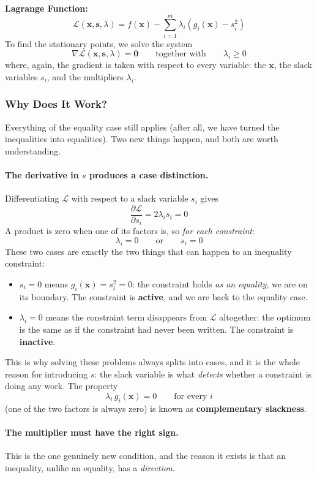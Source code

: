 \documentclass[]{article}
\begin{document}
	\textbf{Lagrange Function:}
	$$
	\mathcal{L}(\mathbf{x}, \mathbf{s}, \lambda)
	= f(\mathbf{x}) - \sum_{i=1}^m \lambda_i \left( g_i(\mathbf{x}) - s_i^2 \right)
	$$
	To find the stationary points, we solve the system
	$$
	\nabla \mathcal{L}(\mathbf{x}, \mathbf{s}, \lambda) = \mathbf{0}
	\qquad \text{together with} \qquad
	\lambda_i \geq 0
	$$
	where, again, the gradient is taken with respect to every variable: the $\mathbf{x}$, the slack variables $s_i$, and the multipliers $\lambda_i$.

	\subsubsection{Why Does It Work?}

	Everything of the equality case still applies (after all, we have turned the inequalities into equalities).
	Two new things happen, and both are worth understanding.

	\paragraph{The derivative in $s$ produces a case distinction.}
	Differentiating $\mathcal{L}$ with respect to a slack variable $s_i$ gives
	$$
	\frac{\partial \mathcal{L}}{\partial s_i} = 2 \lambda_i s_i = 0
	$$
	A product is zero when one of its factors is, so \textit{for each constraint}:
	$$
	\lambda_i = 0
	\qquad \text{or} \qquad
	s_i = 0
	$$
	These two cases are exactly the two things that can happen to an inequality constraint:
	\begin{itemize}
		\item $s_i = 0$ means $g_i(\mathbf{x}) = s_i^2 = 0$: the constraint holds \textit{as an equality}, we are on its boundary.
		The constraint is \textbf{active}, and we are back to the equality case.
		\item $\lambda_i = 0$ means the constraint term disappears from $\mathcal{L}$ altogether: the optimum is the same as if the constraint had never been written.
		The constraint is \textbf{inactive}.
	\end{itemize}
	This is why solving these problems always splits into cases, and it is the whole reason for introducing $s$: the slack variable is what \textit{detects} whether a constraint is doing any work.
	The property
	$$
	\lambda_i \, g_i(\mathbf{x}) = 0 \qquad \text{for every } i
	$$
	(one of the two factors is always zero) is known as \textbf{complementary slackness}.

	\paragraph{The multiplier must have the right sign.}
	This is the one genuinely new condition, and the reason it exists is that an inequality, unlike an equality, has a \textit{direction}.
\end{document}
